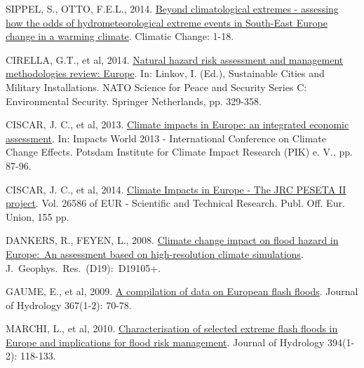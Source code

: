 \documentclass[12pt]{article}
\begin{document}
\begin{center}
{{\begin{spacing}{0.85}

\begin{nohyphens}

\begin{thebibliography}{43}

\footnotesize\setlength{\itemsep}{-0.5mm}
\newcommand{\TitleURL}[2]{\href{#1}{#2}}

SIPPEL, S., OTTO, F.E.L., 2014. \TitleURL{http://dx.doi.org/10.1007/s10584-014-1153-9}{Beyond climatological extremes - assessing how the odds of hydrometeorological extreme events in South-East Europe change in a warming climate}. Climatic Change: 1-18.


CIRELLA, G.T., et al, 2014. \TitleURL{http://dx.doi.org/10.1007/978-94-007-7161-1\_16}{Natural hazard risk assessment and management methodologies review: Europe}. In: Linkov, I. (Ed.), Sustainable Cities and Military Installations. NATO Science for Peace and Security Series C: Environmental Security. Springer Netherlands, pp. 329-358.


CISCAR, J. C., et al, 2013. \TitleURL{http://www.climate-impacts-2013.org/files/cwi\_ciscar.pdf}{Climate impacts in Europe: an integrated economic assessment}. In: Impacts World 2013 - International Conference on Climate Change Effects. Potsdam Institute for Climate Impact Research (PIK) e. V., pp. 87-96. 

CISCAR, J. C., et al, 2014. \TitleURL{http://dx.doi.org/10.2791/7409}{Climate Impacts in Europe - The JRC PESETA II project}. Vol. 26586 of EUR - Scientific and Technical Research. Publ. Off. Eur. Union, 155 pp. 


DANKERS, R., FEYEN, L., 2008. \TitleURL{http://dx.doi.org/10.1029/2007jd009719}{Climate change impact on flood hazard in Europe:~An assessment based on high-resolution climate simulations}. J.~\!Geophys.~\!Res.~(D19):~\!D19105+.


GAUME, E., et al, 2009. \TitleURL{http://dx.doi.org/10.1016/j.jhydrol.2008.12.028}{A compilation of data on European flash floods}. Journal of Hydrology 367(1-2): 70-78.


MARCHI, L., et al, 2010. \TitleURL{http://dx.doi.org/10.1016/j.jhydrol.2010.07.017}{Characterisation of selected extreme flash floods in Europe and implications for flood risk management}. Journal of Hydrology 394(1-2): 118-133.



\end{thebibliography}
\end{nohyphens}
\end{spacing}}}
\end{center}
\end{document}

